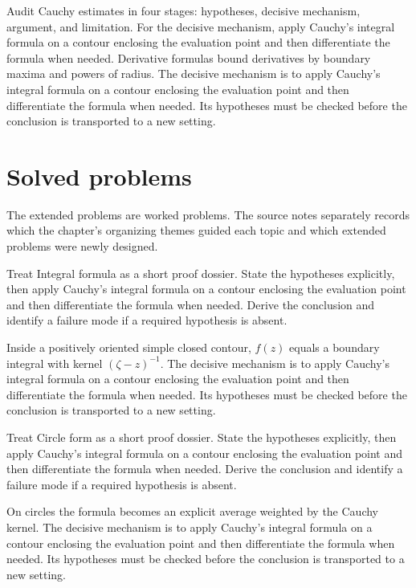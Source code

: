 \begin{example}\label{ex:iv06-worked-04}
Audit Cauchy estimates in four stages: hypotheses, decisive mechanism, argument, and limitation. For the decisive mechanism, apply Cauchy's integral formula on a contour enclosing the evaluation point and then differentiate the formula when needed. Derivative formulas bound derivatives by boundary maxima and powers of radius. The decisive mechanism is to apply Cauchy's integral formula on a contour enclosing the evaluation point and then differentiate the formula when needed. Its hypotheses must be checked before the conclusion is transported to a new setting.
\end{example}

\section{Solved problems}
The extended problems are worked problems. The source notes separately records which the chapter's organizing themes guided each topic and which extended problems were newly designed.

\begin{problem}\label{prob:iv06-problem-01}
Treat Integral formula as a short proof dossier. State the hypotheses explicitly, then apply Cauchy's integral formula on a contour enclosing the evaluation point and then differentiate the formula when needed. Derive the conclusion and identify a failure mode if a required hypothesis is absent.
\end{problem}
\begin{solution}
Inside a positively oriented simple closed contour, $f(z)$ equals a boundary integral with kernel $(\zeta-z)^{-1}$. The decisive mechanism is to apply Cauchy's integral formula on a contour enclosing the evaluation point and then differentiate the formula when needed. Its hypotheses must be checked before the conclusion is transported to a new setting.
\end{solution}

\begin{problem}\label{prob:iv06-problem-02}
Treat Circle form as a short proof dossier. State the hypotheses explicitly, then apply Cauchy's integral formula on a contour enclosing the evaluation point and then differentiate the formula when needed. Derive the conclusion and identify a failure mode if a required hypothesis is absent.
\end{problem}
\begin{solution}
On circles the formula becomes an explicit average weighted by the Cauchy kernel. The decisive mechanism is to apply Cauchy's integral formula on a contour enclosing the evaluation point and then differentiate the formula when needed. Its hypotheses must be checked before the conclusion is transported to a new setting.
\end{solution}

